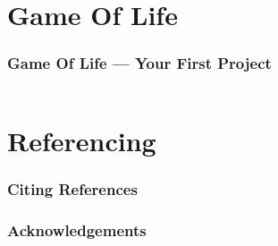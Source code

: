 \documentclass[en, 11pt, xcolor=dvipsnames]{beamer}
\begin{document}

\section{Game Of Life}
\begin{frame}[fragile]
	\frametitle{Game Of Life --- Your First Project}


	\begin{columns}[c]
		\begin{column}{0.98\textwidth}



		\end{column}
	\end{columns}
\end{frame}

\QApage


\section{Referencing}

\begin{frame}
	\frametitle{Citing References}

	\bigskip %

\end{frame}




\begin{frame}
	\frametitle{Acknowledgements}

	\begin{columns}[t] %
		\begin{column}{0.45\textwidth} %
		\end{column}
		\begin{column}{0.5\textwidth} %
		\end{column}
	\end{columns}
\end{frame}
\end{document}
